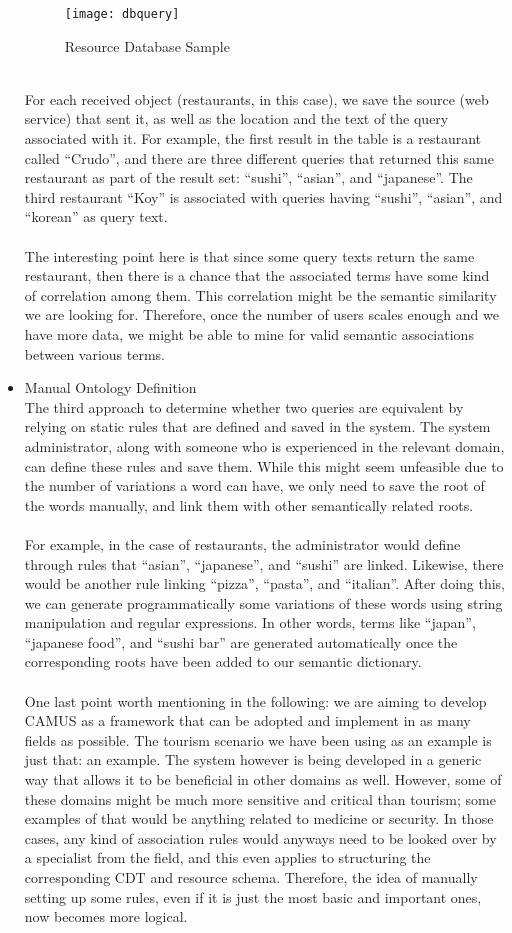 \begin{itemize}
\begin{figure}[h]
\centering
\texttt{[image: dbquery]}
\caption{Resource Database Sample}
\end{figure}
\\
For each received object (restaurants, in this case), we save the source (web service) that sent it, as well as the location and the text of the query associated with it. For example, the first result in the table is a restaurant called ``Crudo'', and there are three different queries that returned this same restaurant as part of the result set: ``sushi'', ``asian'', and ``japanese''. The third restaurant ``Koy'' is associated with queries having ``sushi'', ``asian'', and ``korean'' as query text.\\\\
The interesting point here is that since some query texts return the same restaurant, then there is a chance that the associated terms have some kind of correlation among them. This correlation might be the semantic similarity we are looking for. Therefore, once the number of users scales enough and we have more data, we might be able to mine for valid semantic associations between various terms.
\pagebreak
\item Manual Ontology Definition\\
The third approach to determine whether two queries are equivalent by relying on static rules that are defined and saved in the system. The system administrator, along with someone who is experienced in the relevant domain, can define these rules and save them. While this might seem unfeasible due to the number of variations a word can have, we only need to save the root of the words manually, and link them with other semantically related roots.\\\\
For example, in the case of restaurants, the administrator would define through rules that ``asian'', ``japanese'', and ``sushi'' are linked. Likewise, there would be another rule linking ``pizza'', ``pasta'', and ``italian''. After doing this, we can generate programmatically some variations of these words using string manipulation and regular expressions. In other words, terms like ``japan'', ``japanese food'', and ``sushi bar'' are generated automatically once the corresponding roots have been added to our semantic dictionary.\\\\
One last point worth mentioning in the following: we are aiming to develop CAMUS as a framework that can be adopted and implement in as many fields as possible. The tourism scenario we have been using as an example is just that: an example. The system however is being developed in a generic way that allows it to be beneficial in other domains as well. However, some of these domains might be much more sensitive and critical than tourism; some examples of that would be anything related to medicine or security. In those cases, any kind of association rules would anyways need to be looked over by a specialist from the field, and this even applies to structuring the corresponding CDT and resource schema. Therefore, the idea of manually setting up some rules, even if it is just the most basic and important ones, now becomes more logical.

\end{itemize}
